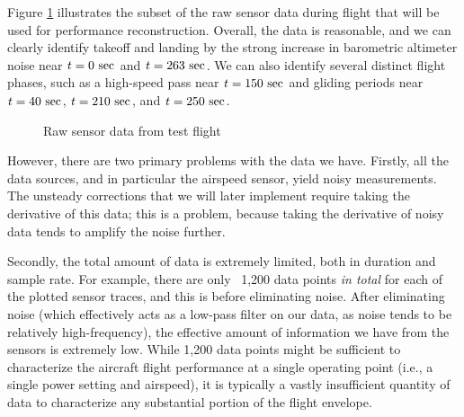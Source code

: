 \documentclass[conf]{new-aiaa}
\begin{document}
    Figure \ref{fig:raw_flight_data} illustrates the subset of the raw sensor data during flight that will be used for performance reconstruction. Overall, the data is reasonable, and we can clearly identify takeoff and landing by the strong increase in barometric altimeter noise near $t=0\ \rm sec$ and $t=263\ \rm sec$. We can also identify several distinct flight phases, such as a high-speed pass near $t=150\ \rm sec$ and gliding periods near $t=40\ \rm sec$, $t=210\ \rm sec$, and $t=250\ \rm sec$.

    \begin{figure}[!htb]
        \centering
        \caption{Raw sensor data from test flight}
        \label{fig:raw_flight_data}
    \end{figure}


    However, there are two primary problems with the data we have. Firstly, all the data sources, and in particular the airspeed sensor, yield noisy measurements. The unsteady corrections that we will later implement require taking the derivative of this data; this is a problem, because taking the derivative of noisy data tends to amplify the noise further.

    Secondly, the total amount of data is extremely limited, both in duration and sample rate. For example, there are only ~1,200 data points \emph{in total} for each of the plotted sensor traces, and this is before eliminating noise. After eliminating noise (which effectively acts as a low-pass filter on our data, as noise tends to be relatively high-frequency), the effective amount of information we have from the sensors is extremely low. While 1,200 data points might be sufficient to characterize the aircraft flight performance at a single operating point (i.e., a single power setting and airspeed), it is typically a vastly insufficient quantity of data to characterize any substantial portion of the flight envelope.
\end{document}
